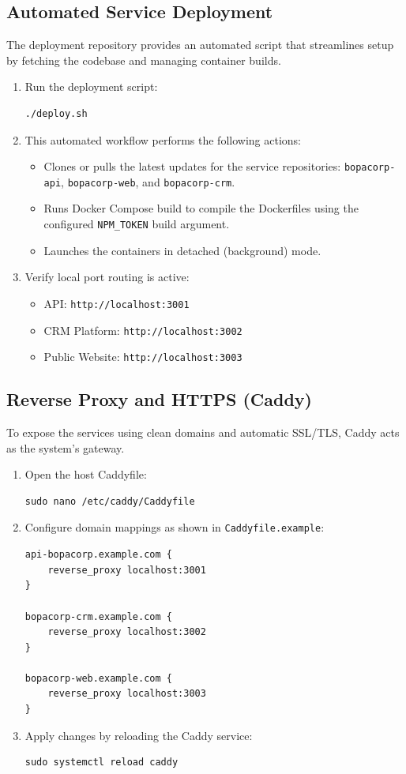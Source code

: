\documentclass[letterpaper%
, oneside%
, 12pt%
, memoireprojet%
, english%
,creativecommons,hyperref, withAlgo2e %
]{thETS}
\begin{document}
\subsection{Automated Service Deployment}
The deployment repository provides an automated script that streamlines setup by fetching the codebase and managing container builds.
\begin{enumerate}
\item Run the deployment script:
\begin{verbatim}
./deploy.sh
\end{verbatim}
\item This automated workflow performs the following actions:
\newline
\begin{itemize}
\item Clones or pulls the latest updates for the service repositories: \texttt{bopacorp-api}, \texttt{bopacorp-web}, and \texttt{bopacorp-crm}.
\item Runs Docker Compose build to compile the Dockerfiles using the configured \texttt{NPM\_TOKEN} build argument.
\item Launches the containers in detached (background) mode.
\end{itemize}
\item Verify local port routing is active:
\newline

\begin{itemize}
\item API: \texttt{http://localhost:3001}
\item CRM Platform: \texttt{http://localhost:3002}
\item Public Website: \texttt{http://localhost:3003}
\end{itemize}
\end{enumerate}

\subsection{Reverse Proxy and HTTPS (Caddy)}
To expose the services using clean domains and automatic SSL/TLS, Caddy acts as the system's gateway.
\begin{enumerate}
\item Open the host Caddyfile:
\begin{verbatim}
sudo nano /etc/caddy/Caddyfile
\end{verbatim}
\item Configure domain mappings as shown in \texttt{Caddyfile.example}:
\begin{verbatim}
api-bopacorp.example.com {
    reverse_proxy localhost:3001
}

bopacorp-crm.example.com {
    reverse_proxy localhost:3002
}

bopacorp-web.example.com {
    reverse_proxy localhost:3003
}
\end{verbatim}
\item Apply changes by reloading the Caddy service:
\begin{verbatim}
sudo systemctl reload caddy
\end{verbatim}
\end{enumerate}
\end{document}

